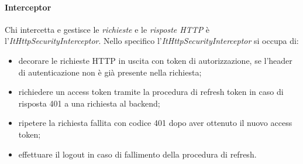 \paragraph{Interceptor} Chi intercetta e gestisce le \textit{richieste} e le \textit{risposte HTTP} è l'\textit{ItHttpSecurityInterceptor}.
Nello specifico l'\textit{ItHttpSecurityInterceptor} si occupa di: 
\begin{itemize}
    \item decorare le richieste HTTP in uscita con token di autorizzazione, se l'header di autenticazione non è già presente nella richiesta;
    \item richiedere un access token tramite la procedura di refresh token in caso di risposta 401 a una richiesta al backend;
    \item ripetere la richiesta fallita con codice 401 dopo aver ottenuto il nuovo access token;
    \item effettuare il logout in caso di fallimento della procedura di refresh.
\end{itemize}
